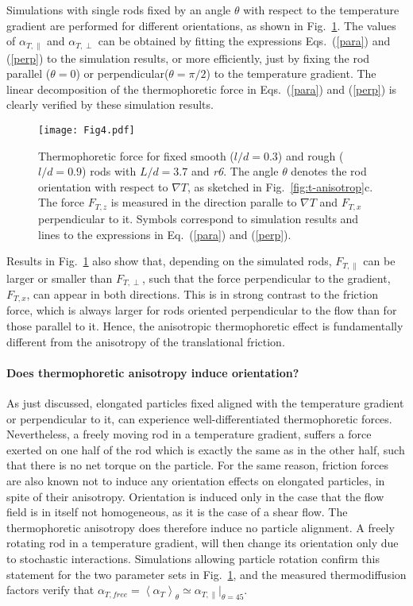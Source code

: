 \documentclass[aps,pre,twocolumn,showpacs,superscriptaddress]{revtex4-1}
\newcommand{\av}[1]{\left\langle #1 \right\rangle}
\begin{document}
Simulations with single rods fixed by an angle $\theta $ with respect
to the temperature gradient are performed for different orientations,
as shown in Fig.~\ref{fig:FT_angle}.  The values of $\alpha_{T,\|}$
and $\alpha_{T,\perp}$ can be obtained by fitting the expressions
Eqs.~(\ref{para}) and (\ref{perp}) to the simulation results, or more
efficiently, just by fixing the rod parallel ($\theta=0$) or
perpendicular($\theta=\pi/2$) to the temperature gradient.  The linear
decomposition of the thermophoretic force in Eqs.~(\ref{para}) and
(\ref{perp}) is clearly verified by these simulation results.

\begin{figure}[h!]
\texttt{[image: Fig4.pdf]}
\caption{Thermophoretic force for fixed smooth ($l/d= 0.3$) and 
  rough ($l/d= 0.9$) rods with  $L/d=3.7$ and {\em r6}.
   The angle $\theta$ denotes the rod orientation with respect to
  $\nabla T$, as sketched in Fig.~\ref{fig:t-anisotrop}c.  The force
  $F_{T,z}$ is measured in the direction paralle to $\nabla T$ and
  $F_{T,x}$ perpendicular to it. Symbols correspond to simulation
  results and lines to the expressions in Eq.~(\ref{para}) and
  (\ref{perp}).
  \label{fig:FT_angle}}
\end{figure}

Results in Fig.~\ref{fig:FT_angle} also show that, depending on the
simulated rods, $F_{T,\|}$ can be larger or smaller than
$F_{T,\perp}$, such that the force perpendicular to the gradient,
$F_{T,x}$, can appear in both directions. This is in strong contrast to the
friction force, which is always larger for rods oriented perpendicular
to the flow than for those parallel to it.  Hence, the anisotropic
thermophoretic effect is fundamentally different from the anisotropy
of the translational friction.

\paragraph{Does thermophoretic anisotropy  induce orientation?}
As just discussed, elongated particles fixed aligned with the
temperature gradient or perpendicular to it, can experience
well-differentiated thermophoretic forces.  Nevertheless, a freely
moving rod in a temperature gradient, suffers a force exerted on one
half of the rod which is exactly the same as in the other half, such
that there is no net torque on the particle.  For the same reason,
friction forces are also known not to induce any orientation effects
on elongated particles, in spite of their anisotropy. Orientation is
induced only in the case that the flow field is in itself not
homogeneous, as it is the case of a shear flow.  %
The thermophoretic anisotropy does therefore induce no particle
alignment. A freely rotating rod in a temperature gradient, will then
change its orientation only due to stochastic interactions. %
Simulations allowing particle rotation confirm this statement for the
two parameter sets in Fig.~\ref{fig:FT_angle}, and the measured
thermodiffusion factors verify that $\alpha_{T,free}
=\av{\alpha_{T}}_{\theta} \simeq \alpha_{T,\|}|_{\theta=45}$.  %
\end{document}

